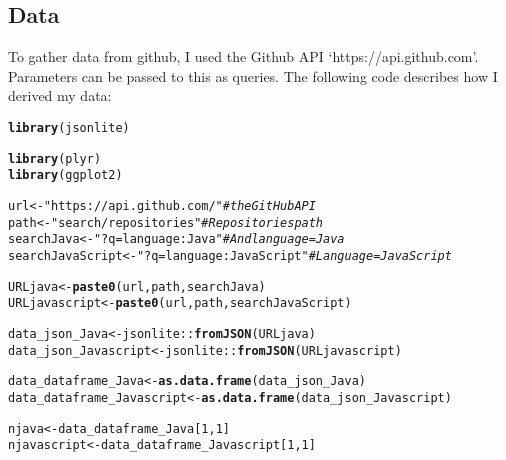 \documentclass{article}\usepackage[]{graphicx}\usepackage[]{color}
\makeatletter
\newcommand{\hlnum}[1]{\textcolor[rgb]{0.686,0.059,0.569}{#1}}%
\newcommand{\hlstr}[1]{\textcolor[rgb]{0.192,0.494,0.8}{#1}}%
\newcommand{\hlcom}[1]{\textcolor[rgb]{0.678,0.584,0.686}{\textit{#1}}}%
\newcommand{\hlopt}[1]{\textcolor[rgb]{0,0,0}{#1}}%
\newcommand{\hlstd}[1]{\textcolor[rgb]{0.345,0.345,0.345}{#1}}%
\newcommand{\hlkwb}[1]{\textcolor[rgb]{0.69,0.353,0.396}{#1}}%
\newcommand{\hlkwd}[1]{\textcolor[rgb]{0.737,0.353,0.396}{\textbf{#1}}}%
\newenvironment{kframe}{%
 \def\at@end@of@kframe{}%
 \ifinner\ifhmode%
  \def\at@end@of@kframe{\end{minipage}}%
  \begin{minipage}{\columnwidth}%
 \fi\fi%
 \def\FrameCommand##1{\hskip\@totalleftmargin \hskip-\fboxsep
 \colorbox{shadecolor}{##1}\hskip-\fboxsep
     \hskip-\linewidth \hskip-\@totalleftmargin \hskip\columnwidth}%
 \MakeFramed {\advance\hsize-\width
   \@totalleftmargin\z@ \linewidth\hsize
   \@setminipage}}%
 {\par\unskip\endMakeFramed%
 \at@end@of@kframe}
\newenvironment{knitrout}{}{} %
\makeatother
\begin{document}

\bigskip

\subsection*{Data}
To gather data from github, I used the Github API ‘https://api.github.com’. Parameters can be passed to this as queries. The following code describes how I derived my data:

\begin{knitrout}
\color{fgcolor}\begin{kframe}
\begin{alltt}
\hlkwd{library}\hlstd{(jsonlite)}
\end{alltt}


{\ttfamily\noindent\itshape\color{messagecolor}{\#\# \\\#\# Attaching package: 'jsonlite'\\\#\# \\\#\# The following object is masked from 'package:utils':\\\#\# \\\#\#\ \ \ \  View}}\begin{alltt}
\hlkwd{library}\hlstd{(plyr)}
\hlkwd{library}\hlstd{(ggplot2)}

\hlstd{url} \hlkwb{<-} \hlstr{"https://api.github.com/"}  \hlcom{# the GitHub API}
\hlstd{path} \hlkwb{<-} \hlstr{"search/repositories"}  \hlcom{# Repositories path}
\hlstd{searchJava} \hlkwb{<-} \hlstr{"?q=language:Java"}  \hlcom{# And language = Java}
\hlstd{searchJavaScript} \hlkwb{<-} \hlstr{"?q=language:JavaScript"}  \hlcom{# Language = JavaScript}

\hlstd{URLjava} \hlkwb{<-} \hlkwd{paste0}\hlstd{(url, path, searchJava)}
\hlstd{URLjavascript} \hlkwb{<-} \hlkwd{paste0}\hlstd{(url, path, searchJavaScript)}

\hlstd{data_json_Java} \hlkwb{<-} \hlstd{jsonlite}\hlopt{::}\hlkwd{fromJSON}\hlstd{(URLjava)}
\hlstd{data_json_Javascript} \hlkwb{<-} \hlstd{jsonlite}\hlopt{::}\hlkwd{fromJSON}\hlstd{(URLjavascript)}

\hlstd{data_dataframe_Java} \hlkwb{<-} \hlkwd{as.data.frame}\hlstd{(data_json_Java)}
\hlstd{data_dataframe_Javascript} \hlkwb{<-} \hlkwd{as.data.frame}\hlstd{(data_json_Javascript)}

\hlstd{njava} \hlkwb{<-} \hlstd{data_dataframe_Java[}\hlnum{1}\hlstd{,} \hlnum{1}\hlstd{]}
\hlstd{njavascript} \hlkwb{<-} \hlstd{data_dataframe_Javascript[}\hlnum{1}\hlstd{,} \hlnum{1}\hlstd{]}


\end{alltt}
\end{kframe}
\end{knitrout}
\end{document}
